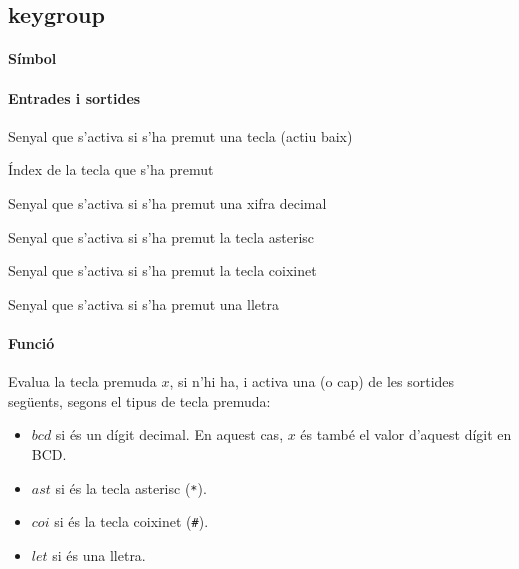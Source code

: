 \subsection{\label{sub:\projectname-keygroup} \textsf{keygroup}}

\paragraph{Símbol}

\begin{center}  \end{center}

\paragraph{Entrades i sortides}

\begin{where}
\item[\nodenamebit{nkey}] Senyal que s'activa si s'ha premut una tecla (actiu baix)
\item[\nodenamerange{x}{3}{0}] Índex de la tecla que s'ha premut
\item[\nodenamebit{bcd}] Senyal que s'activa si s'ha premut una xifra decimal
\item[\nodenamebit{ast}] Senyal que s'activa si s'ha premut la tecla asterisc
\item[\nodenamebit{coi}] Senyal que s'activa si s'ha premut la tecla coixinet
\item[\nodenamebit{let}] Senyal que s'activa si s'ha premut una lletra
\end{where}

\paragraph{Funció}

Evalua la tecla premuda $x$, si n'hi ha, i activa una (o cap) de les sortides següents,
segons el tipus de tecla premuda:

\begin{itemize}
\item $bcd$ si és un dígit decimal. En aquest cas, $x$ és també
el valor d'aquest dígit en BCD.
\item $ast$ si és la tecla asterisc (\texttt{*}).
\item $coi$ si és la tecla coixinet (\texttt{\#}).
\item $let$ si és una lletra.
\end{itemize}

